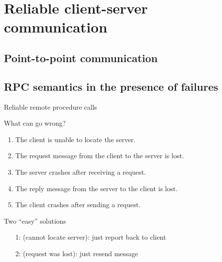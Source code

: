 \section{Reliable client-server communication}
\subsection{Point-to-point communication}
\subsection{RPC semantics in the presence of failures}
\begin{slide}{Reliable remote procedure calls}
  \begin{block}{What can go wrong?}
    \begin{enumerate}
    \item The client is unable to locate the server.
    \item The request message from the client to the server is lost.
    \item The server crashes after receiving a request.
    \item The reply message from the server to the client is lost.
    \item The client crashes after sending a request.
    \end{enumerate}
  \end{block}
  \begin{block}{Two ``easy'' solutions}
    \begin{itemize}
    \item[1:] (cannot locate server): just report back to client
    \item[2:] (request was lost): just resend message
    \end{itemize}
  \end{block}
\end{slide}
